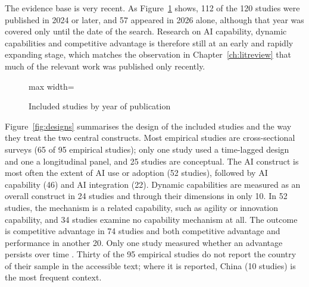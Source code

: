 The evidence base is very recent. As Figure~\ref{fig:years} shows, 112 of the 120 studies were published in 2024 or later, and 57 appeared in 2026 alone, although that year was covered only until the date of the search. Research on AI capability, dynamic capabilities and competitive advantage is therefore still at an early and rapidly expanding stage, which matches the observation in Chapter~\ref{ch:litreview} that much of the relevant work was published only recently.

\begin{figure}[htbp]
\centering
\caption{Included studies by year of publication}
\label{fig:years}
\begin{adjustbox}{max width=\textwidth}
\end{adjustbox}
\end{figure}

Figure~\ref{fig:designs} summarises the design of the included studies and the way they treat the two central constructs. Most empirical studies are cross-sectional surveys (65 of 95 empirical studies); only one study used a time-lagged design and one a longitudinal panel, and 25 studies are conceptual. The AI construct is most often the extent of AI use or adoption (52 studies), followed by AI capability (46) and AI integration (22). Dynamic capabilities are measured as an overall construct in 24 studies and through their dimensions in only 10. In 52 studies, the mechanism is a related capability, such as agility or innovation capability, and 34 studies examine no capability mechanism at all. The outcome is competitive advantage in 74 studies and both competitive advantage and performance in another 20. Only one study measured whether an advantage persists over time \parencite{dzreke2025}. Thirty of the 95 empirical studies do not report the country of their sample in the accessible text; where it is reported, China (10 studies) is the most frequent context.

